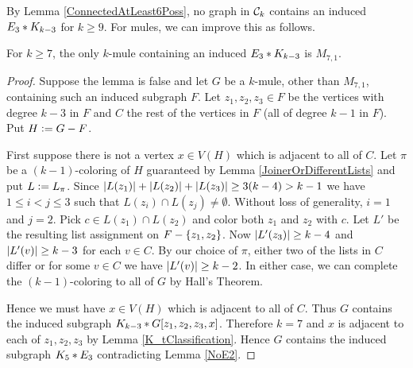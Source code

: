 By Lemma \ref{ConnectedAtLeast6Poss}, no graph in $\mathcal{C}_{k}$ contains an induced $E_3 \mbox{\hspace{2 pt}$\ast$\hspace{2 pt}} K_{k - 3}$ for $k \geq 9$.  
For mules, we can improve this as follows.
\begin{lem}\label{NoE3}
For $k \geq 7$, the only $k$-mule containing an induced $E_3 \mbox{\hspace{2 pt}$\ast$\hspace{2 pt}} K_{k - 3}$ is $M_{7,1}$.
\end{lem}
\begin{proof}
Suppose the lemma is false and let $G$ be a $k$-mule, other than $M_{7,1}$, containing such an induced subgraph $F$.  
Let $z_1, z_2, z_3 \in F$ be the vertices with degree $k-3$ in $F$ and $C$ the rest of the vertices in $F$ (all of degree $k-1$ in $F$). 
Put $H \mathrel{\mathop:}= G - F$.

First suppose there is not a vertex $x \in V(H)$ which is adjacent to all of $C$. 
Let $\pi$ be a $(k - 1)$-coloring of $H$ guaranteed by Lemma
\ref{JoinerOrDifferentLists} and put $L \mathrel{\mathop:}= L_\pi$.  Since $\left|L(z_1)\right|
+ \left|L(z_2)\right| + \left|L(z_3)\right| \geq 3(k-4) > k - 1$ we have $1 \leq i < j \leq 3$ such that $L(z_i) \cap L(z_j) \neq \emptyset$.  
Without loss of generality, $i = 1$ and $j = 2$. Pick $c \in L(z_1) \cap L(z_2)$ and color both $z_1$ and $z_2$ with $c$.  
Let $L'$ be the resulting list assignment on $F - \left\{ z_1, z_2 \right\}$.  
Now $\left|L'(z_3)\right| \geq k-4$ and $\left|L'(v)\right| \geq k-3$ for each $v \in C$.  
By our choice of $\pi$, either two of the lists in $C$ differ or for some $v \in C$ we have $\left|L'(v)\right| \geq k-2$.  
In either case, we can complete the $(k - 1)$-coloring to all of $G$ by Hall's Theorem.

Hence we must have $x \in V(H)$ which is adjacent to all of $C$.  
Thus $G$ contains the induced subgraph $K_{k-3} \mbox{\hspace{2 pt}$\ast$\hspace{2 pt}} G[z_1, z_2, z_3, x]$.  
Therefore $k = 7$ and $x$ is adjacent to each of $z_1, z_2, z_3$ by Lemma \ref{K_tClassification}.  
Hence $G$ contains the induced subgraph $K_5 \mbox{\hspace{2 pt}$\ast$\hspace{2 pt}} E_3$ contradicting Lemma \ref{NoE2}.
\end{proof}

